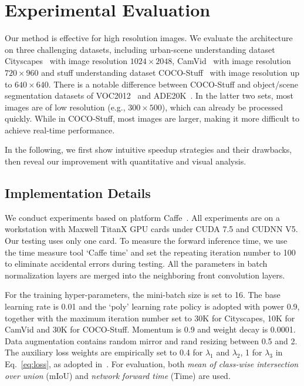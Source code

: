 \documentclass[runningheads]{llncs}
\begin{document}
\section{Experimental Evaluation}\label{sec:experiment}
Our method is effective for high resolution images. We evaluate the architecture on three challenging datasets, including urban-scene understanding dataset Cityscapes~\cite{cordts2016cityscapes} with image resolution $1024 \times 2048$, CamVid~\cite{BrostowFC09} with image resolution $720 \times 960$ and stuff understanding dataset COCO-Stuff~\cite{caesar2016coco} with image resolution up to $640 \times 640$. There is a notable difference between COCO-Stuff and object/scene segmentation datasets of VOC2012~\cite{everingham2010pascal} and ADE20K~\cite{zhou2016semantic}. In the latter two sets, most images are of low resolution (e.g., $300 \times 500$), which can already be processed quickly. While in COCO-Stuff, most images are larger, making it more difficult to achieve real-time performance.

In the following, we first show intuitive speedup strategies and their drawbacks, then reveal our improvement with quantitative and visual analysis. 

\subsection{Implementation Details}
We conduct experiments based on platform Caffe~\cite{jia2014caffe}. All experiments are on a workstation with Maxwell TitanX GPU cards under CUDA 7.5 and CUDNN V5. Our testing uses only one card. To measure the forward inference time, we use the time measure tool `Caffe time' and set the repeating iteration number to 100 to eliminate accidental errors during testing. All the parameters in batch normalization layers are merged into the neighboring front convolution layers. 

For the training hyper-parameters, the mini-batch size is set to 16. The base learning rate is 0.01 and the `poly' learning rate policy is adopted with power 0.9, together with the maximum iteration number set to 30K for Cityscapes, 10K for CamVid and 30K for COCO-Stuff. Momentum is 0.9 and weight decay is 0.0001. Data augmentation contains random mirror and rand resizing between 0.5 and 2. The auxiliary loss weights are empirically set to 0.4 for $\lambda_1$ and $\lambda_2$, 1 for $\lambda_3$ in Eq.~\ref{eq:loss}, as adopted in~\cite{zhao2017pspnet}. For evaluation, both \textit{mean of class-wise intersection over union} (mIoU) and \textit{network forward time} (Time) are used.
\end{document}
